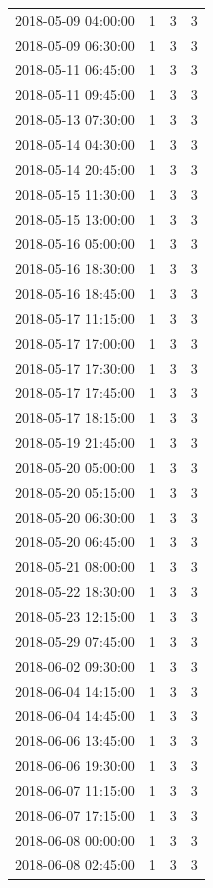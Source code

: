 \begin{tabular}{lrrr}
2018-05-09 04:00:00 & 1 & 3 & 3 \\
2018-05-09 06:30:00 & 1 & 3 & 3 \\
2018-05-11 06:45:00 & 1 & 3 & 3 \\
2018-05-11 09:45:00 & 1 & 3 & 3 \\
2018-05-13 07:30:00 & 1 & 3 & 3 \\
2018-05-14 04:30:00 & 1 & 3 & 3 \\
2018-05-14 20:45:00 & 1 & 3 & 3 \\
2018-05-15 11:30:00 & 1 & 3 & 3 \\
2018-05-15 13:00:00 & 1 & 3 & 3 \\
2018-05-16 05:00:00 & 1 & 3 & 3 \\
2018-05-16 18:30:00 & 1 & 3 & 3 \\
2018-05-16 18:45:00 & 1 & 3 & 3 \\
2018-05-17 11:15:00 & 1 & 3 & 3 \\
2018-05-17 17:00:00 & 1 & 3 & 3 \\
2018-05-17 17:30:00 & 1 & 3 & 3 \\
2018-05-17 17:45:00 & 1 & 3 & 3 \\
2018-05-17 18:15:00 & 1 & 3 & 3 \\
2018-05-19 21:45:00 & 1 & 3 & 3 \\
2018-05-20 05:00:00 & 1 & 3 & 3 \\
2018-05-20 05:15:00 & 1 & 3 & 3 \\
2018-05-20 06:30:00 & 1 & 3 & 3 \\
2018-05-20 06:45:00 & 1 & 3 & 3 \\
2018-05-21 08:00:00 & 1 & 3 & 3 \\
2018-05-22 18:30:00 & 1 & 3 & 3 \\
2018-05-23 12:15:00 & 1 & 3 & 3 \\
2018-05-29 07:45:00 & 1 & 3 & 3 \\
2018-06-02 09:30:00 & 1 & 3 & 3 \\
2018-06-04 14:15:00 & 1 & 3 & 3 \\
2018-06-04 14:45:00 & 1 & 3 & 3 \\
2018-06-06 13:45:00 & 1 & 3 & 3 \\
2018-06-06 19:30:00 & 1 & 3 & 3 \\
2018-06-07 11:15:00 & 1 & 3 & 3 \\
2018-06-07 17:15:00 & 1 & 3 & 3 \\
2018-06-08 00:00:00 & 1 & 3 & 3 \\
2018-06-08 02:45:00 & 1 & 3 & 3 \\

\end{tabular}
